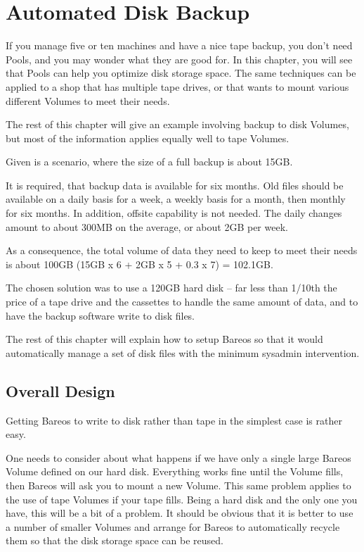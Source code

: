 
\chapter{Automated Disk Backup}
\label{PoolsChapter}

If you manage five or ten machines and have a nice tape backup, you don't need
Pools, and you may wonder what they are good for. In this chapter, you will
see that Pools can help you optimize disk storage space. The same techniques
can be applied to a shop that has multiple tape drives, or that wants to mount
various different Volumes to meet their needs.

The rest of this chapter will give an example involving backup to disk
Volumes, but most of the information applies equally well to tape Volumes.

Given is a scenario, where the size of a full backup is about 15GB.

It is required, that backup data is available for six months.
Old files should be available on a daily basis for a week, a weekly basis for a month, then monthly
for six months. In addition, offsite capability is not needed.
The daily changes amount to about
300MB on the average, or about 2GB per week.

As a consequence, the total volume of data they need to keep to meet their
needs is about 100GB (15GB x 6 + 2GB x 5 + 0.3 x 7) = 102.1GB.

The chosen solution was to use a 120GB hard disk -- far
less than 1/10th the price of a tape drive and the cassettes to handle the
same amount of data, and to have the backup software write to disk files.

The rest of this chapter will explain how to setup Bareos so that it would
automatically manage a set of disk files with the minimum sysadmin
intervention.

\section{Overall Design}
\label{OverallDesign}

Getting Bareos to write to disk rather than tape in the simplest case is
rather easy.

One needs to consider about what happens if we have only a single large Bareos
Volume defined on our hard disk. Everything works fine until the Volume fills,
then Bareos will ask you to mount a new Volume. This same problem applies to
the use of tape Volumes if your tape fills. Being a hard disk and the only one
you have, this will be a bit of a problem. It should be obvious that it is
better to use a number of smaller Volumes and arrange for Bareos to
automatically recycle them so that the disk storage space can be reused.

